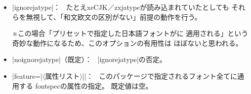 \documentclass[xelatex,ja=standard,jafont=ipaex,
  a4paper]{bxjsarticle}
\newcommand{\Pkg}[1]{\textsf{#1}}
\newcommand{\Meta}[1]{$\langle$\mbox{}#1\mbox{}$\rangle$}
\newcommand{\Note}{\par\noindent ※}
\newcommand{\Means}{：\ }
\newcommand{\JEmph}{\textgt}
\newcommand{\JSl}{\mbox{／}\linebreak[0]}
\begin{document}
\begin{itemize}
\item |ignorejatype|\Means
たとえ\Pkg{xeCJK}\JSl\Pkg{zxjatype}が読み込まれていたとしても
それらを無視して、「和文欧文の区別がない」前提の動作を行う。
\Note この場合「プリセットで指定した日本語フォントが\JEmph{欧文のみ}に
適用される」という奇妙な動作になるため、このオプションの有用性は
ほぼないと思われる。
\item |noignorejatype|（既定）\Means
|ignorejatype|\>の否定。

\item |feature={|\Meta{属性リスト}|}|\Means
このパッケージで指定されるフォント全てに通用する
\Pkg{fontspec}の属性の指定。
既定値は空。

\end{itemize}

\end{document}
